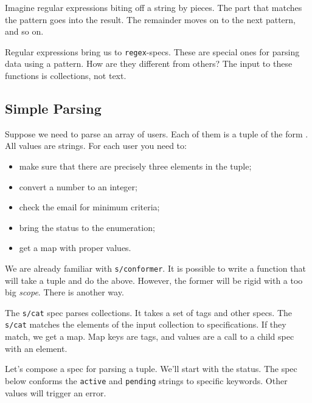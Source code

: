 Imagine regular expressions biting off a string by pieces. The part that matches the pattern goes into the result. The remainder moves on to the next pattern, and so on.

Regular expressions bring us to \verb|regex|-specs. These are special ones for parsing data using a pattern. How are they different from others? The input to these functions is collections, not text.


\subsection{Simple Parsing}

Suppose we need to parse an array of users. Each of them is a tuple of the form . All values are strings. For each user you need to:

\begin{itemize}

\item
  make sure that there are precisely three elements in the tuple;

\item
  convert a number to an integer;

\item
  check the email for minimum criteria;

\item
  bring the status to the enumeration;

\item
  get a map with proper values.

\end{itemize}

We are already familiar with \verb|s/conformer|. It is possible to write a function that will take a tuple and do the above. However, the former will be rigid with a too big \emph{scope}. There is another way.


The \verb|s/cat| spec parses collections. It takes a set of tags and other specs. The \verb|s/cat| matches the elements of the input collection to specifications. If they match, we get a map. Map keys are tags, and values are a call to a child spec with an element.

Let's compose a spec for parsing a tuple. We'll start with the status. The spec below conforms the \verb|active| and \verb|pending| strings to specific keywords. Other values will trigger an error.

